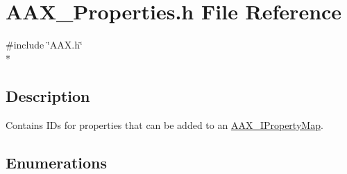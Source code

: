 \hypertarget{a00283}{}\section{A\+A\+X\+\_\+\+Properties.\+h File Reference}
\label{a00283}
{\ttfamily \#include \char`\"{}A\+A\+X.\+h\char`\"{}}\\*


\subsection{Description}
Contains I\+Ds for properties that can be added to an \hyperlink{a00112}{A\+A\+X\+\_\+\+I\+Property\+Map}. 

\subsection*{Enumerations}
